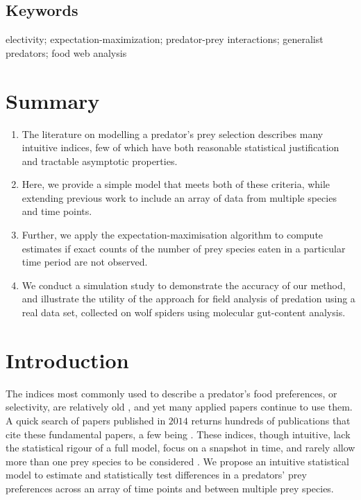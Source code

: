 \documentclass[12pt]{article}
\begin{document}
\subsection*{Keywords}
electivity; expectation-maximization; predator-prey interactions; generalist predators; food web analysis

\newpage
\section*{Summary}
\label{sec:abstract}

\begin{enumerate}
\item The literature on modelling a predator's prey selection describes many intuitive indices, few of which have both reasonable statistical justification and tractable asymptotic properties.
\item Here, we provide a simple model that meets both of these criteria, while extending previous work to include an array of data from multiple species and time points.
\item Further, we apply the expectation-maximisation algorithm to compute estimates if exact counts of the number of prey species eaten in a particular time period are not observed.
\item We conduct a simulation study to demonstrate the accuracy of our method, and illustrate the utility of the approach for field analysis of predation using a real data set, collected on wolf spiders using molecular gut-content analysis.
\end{enumerate}

\section{Introduction}
\label{sec:intro}

The indices most commonly used to describe a predator's food preferences, or selectivity, are relatively old \citep{Ivlev:1964,Jacobs:1974,Chesson:1978,Strauss:1979,Vanderploeg:1979,Chesson:1983}, and yet many applied papers continue to use them.  A quick search of papers published in $2014$ returns hundreds of publications that cite these fundamental papers, a few being \citet{Clements:2014,Hansen:2014,Hellstrom:2014,Lyngdoh:2014,Madduppa:2014}.  These indices, though intuitive, lack the statistical rigour of a full model, focus on a snapshot in time, and rarely allow more than one prey species to be considered \citep{Lechowicz:1982}.  We propose an intuitive statistical model to estimate and statistically test differences in a predators' prey preferences across an array of time points and between multiple prey species.   
\end{document}
